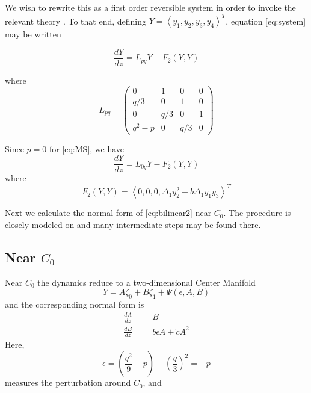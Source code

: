 We wish to rewrite this as a first order reversible system in order to invoke the relevant theory \cite{IA}. 
To that end, defining  $Y=\left<y_1,y_2,y_3,y_4\right>^T$, equation \eqref{eq:system} may be written 

\begin{equation}\label{eq:bilinear}
\frac{ dY }{ dz } = L_{pq} Y - F_2(Y,Y) \end{equation}

where 
\begin{equation}
L_{pq} = \left( 
\begin{array}{cccc}
0&1&0&0\\
q/3&0&1&0\\
0&q/3&0&1\\
q^2 - p &0&q/3&0 \end{array} \right) \end{equation}

Since $p=0$ for \eqref{eq:MS}, we have 
\begin{equation} \label{eq:bilinear2}
 \frac{ dY }{ dz } = L_{0q} Y - F_2(Y,Y) 
\end{equation}
where 
\begin{equation}\label{eq:nonlinear}
F_2(Y,Y) = \left<0,0,0,\Delta_1 y_2^2 + b \Delta_1 y_1 y_3 \right>^T
\end{equation}

Next we calculate the normal form of \eqref{eq:bilinear2} near $C_0$. The procedure is
closely modeled on \cite{IA} and many intermediate steps may be found there. 

\subsection{ Near $C_0$ }
Near $C_0$ the dynamics reduce to a two-dimensional Center Manifold
\begin{equation}\label{eq:c0cm}
 Y = A \zeta_0 + B \zeta_1 + \Psi(\epsilon,A,B)
\end{equation}
and the corresponding normal form is
\begin{subequations}\label{eq:c0nf}
\begin{eqnarray}
\frac{dA}{dz} &=& B \label{eq:c0nfa} \\
\frac{dB}{dz} &=& b \epsilon A + \tilde{c} A^2 \label{eq:c0nfb}
\end{eqnarray}
\end{subequations}
Here,
\begin{equation}
\epsilon = \left( \frac{q^2}{9} - p\right) - \left(\frac{q}{3}\right)^2 = - p 
\end{equation}
measures the perturbation around $C_0$, and

